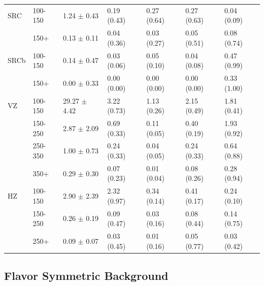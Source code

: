 \begin{table}[!h]
\begin{center}
\begin{tabular} {l |l | l | l | l | l | l}
            SRC & 100-150 & 1.24 $\pm$ 0.43 & 0.19 (0.43) & 0.27 (0.64) & 0.27 (0.63) & 0.04 (0.09) \\
            & 150+ & 0.13 $\pm$ 0.11 & 0.04 (0.36) & 0.03 (0.27) & 0.05 (0.51) & 0.08 (0.74) \\ \hline


            SRCb & 100-150 & 0.14 $\pm$ 0.47 & 0.03 (0.06) & 0.05 (0.10) & 0.04 (0.08) & 0.47 (0.99) \\
            & 150+ & 0.00 $\pm$ 0.33 & 0.00 (0.00) & 0.00 (0.00) & 0.00 (0.00) & 0.33 (1.00) \\ \hline


            VZ & 100-150 & 29.27 $\pm$ 4.42 & 3.22 (0.73) & 1.13 (0.26) & 2.15 (0.49) & 1.81 (0.41) \\
            & 150-250 & 2.87 $\pm$ 2.09 & 0.69 (0.33) & 0.11 (0.05) & 0.40 (0.19) & 1.93 (0.92) \\
            & 250-350 & 1.00 $\pm$ 0.73 & 0.24 (0.33) & 0.04 (0.05) & 0.24 (0.33) & 0.64 (0.88) \\
            & 350+ & 0.29 $\pm$ 0.30 & 0.07 (0.23) & 0.01 (0.04) & 0.08 (0.26) & 0.28 (0.94) \\ \hline


            HZ & 100-150 & 2.90 $\pm$ 2.39 & 2.32 (0.97) & 0.34 (0.14) & 0.41 (0.17) & 0.24 (0.10) \\
            & 150-250 & 0.26 $\pm$ 0.19 & 0.09 (0.47) & 0.03 (0.16) & 0.08 (0.44) & 0.14 (0.75) \\
            & 250+ & 0.09 $\pm$ 0.07 & 0.03 (0.45) & 0.01 (0.16) & 0.05 (0.77) & 0.03 (0.42) \\ \hline

          \end{tabular}
        \end{center}
      \end{table}

  \clearpage


  \subsection{Flavor Symmetric Background} \label{sec:flavor_symmetric_background}
    
